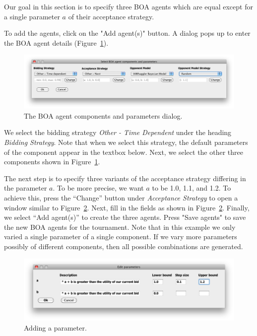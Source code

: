 \documentclass[]{article}
\begin{document}
Our goal in this section is to specify three BOA agents which are equal except for a single parameter $a$ of their acceptance strategy. 

To add the agents, click on the "Add agent(s)" button. A dialog pops up to enter the BOA agent details (Figure~\ref{fig:boadetails}).

\begin{figure}[h!]
	\center
	\includegraphics[width=15cm]{media/BOAdetails.png}
	\caption{The BOA agent components and parameters dialog.}
	\label{fig:boadetails}
\end{figure}

We select the bidding strategy \textit{Other - Time Dependent} under the heading \textit{Bidding Strategy}. Note that when we select this strategy, the default parameters of the component appear in the textbox below. Next, we select the other three components shown in Figure~\ref{fig:boadetails}.

The next step is to specify three variants of the acceptance strategy differing in the parameter $a$. To be more precise, we want $a$ to be 1.0, 1.1, and 1.2. To achieve this, press the ``Change'' button under  \textit{Acceptance Strategy}  to open a window similar to Figure~\ref{fig:boaparam}. Next, fill in the fields as shown in Figure~\ref{fig:boaparam}. Finally, we select ``Add agent(s)'' to create the three agents. Press "Save agents" to save the new BOA agents for the tournament. Note that in this example we only varied a single parameter of a single component. If we vary more parameters possibly of different components, then all possible combinations are generated.

\begin{figure}[h!] 
	\center
	\includegraphics[width=15cm]{media/BOAparam.png}
	\caption{Adding a parameter.}
	\label{fig:boaparam}
\end{figure}
\end{document}
